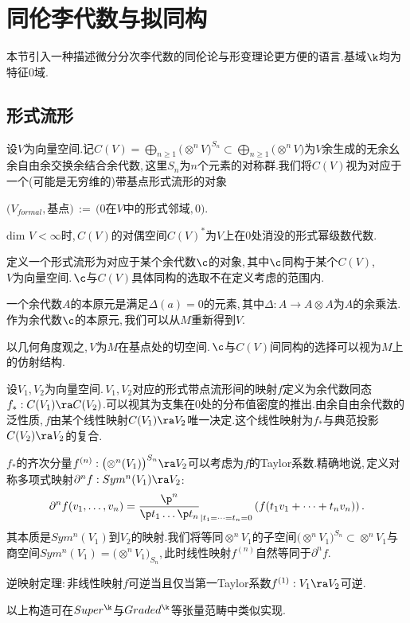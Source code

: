 \chapter{同伦李代数与拟同构}
本节引入一种描述微分分次李代数的同伦论与形变理论更方便的语言.基域$\k$均为特征$0$域.
\section{形式流形}
设$V$为向量空间.记$C(V)=\bigoplus_{n\ge 1}\bigl( \otimes^n V\bigr)^{S_n}
\subset \bigoplus_{n\ge 1}\bigl( \otimes^n V\bigr)$为$V$余生成的无余幺余自由余交换余结合余代数,\,这里$S_n$为$n$个元素的对称群.我们将$C(V)$视为对应于一个(可能是无穷维的)带基点形式流形的对象

$(V_{formal},$基点$)\,:=\,(0$在$V$中的形式邻域$,0)$.

dim $V<\infty $时,\,$C(V)$的对偶空间$C(V)^*$为$V$上在$0$处消没的形式幂级数代数.

定义一个形式流形为对应于某个余代数$\c$的对象,\,其中$\c$同构于某个$C(V)$,\,\\$V$为向量空间.\,$\c$与$C(V)$具体同构的选取不在定义考虑的范围内.

一个余代数$A$的本原元是满足$\Delta (a)=0$的元素,\,其中$\Delta :A\to A\otimes A$为$A$的余乘法.作为余代数$\c$的本原元,\,我们可以从$M$重新得到$V$.

以几何角度观之,\,$V$为$M$在基点处的切空间.\,$\c$与$C(V)$间同构的选择可以视为$M$上的仿射结构.

设$V_1$,\,$V_2$为向量空间.\,$V_1$,\,$V_2$对应的形式带点流形间的映射$f$定义为余代数同态$f_*:C(V_1)\ra C(V_2)$.可以视其为支集在$0$处的分布值密度的推出.由余自由余代数的泛性质,\,$f$由某个线性映射$C(V_1)\ra V_2$唯一决定.这个线性映射为$f_*$与典范投影$C(V_2)\ra V_2$的复合.

$f_*$的齐次分量$f^{(n)}:\bigl(\otimes^n(V_1)\bigr)^{S_n}\ra V_2$可以考虑为$f$的Taylor系数.精确地说,\,定义对称多项式映射$\partial ^n f: Sym^n(V_1)\ra V_2$:\,
$$\partial ^n f(v_1,\dots, v_n)=
        {\p^n\over \p t_1\dots \p t_n}
    _{|t_1=\dots=t_n=0} \left(f(t_1 v_1+\dots+t_n v_n)\right).$$
其本质是$Sym^n(V_1)$到$V_2$的映射.我们将等同$\otimes^n V_1$的子空间$\bigl( \otimes^n V_1\bigr)^{S_n}\subset \otimes^n V_1$与商空间$Sym^n(V_1)=\bigl( \otimes^n V_1\bigr)_{S_n}$,\,此时线性映射$f^{(n)}$自然等同于$\partial ^n f$.

逆映射定理:\,非线性映射$f$可逆当且仅当第一Taylor系数$f^{(1)}:V_1\ra V_2$可逆.

以上构造可在$Super^{\k}$与$Graded^{\k}$等张量范畴中类似实现.



